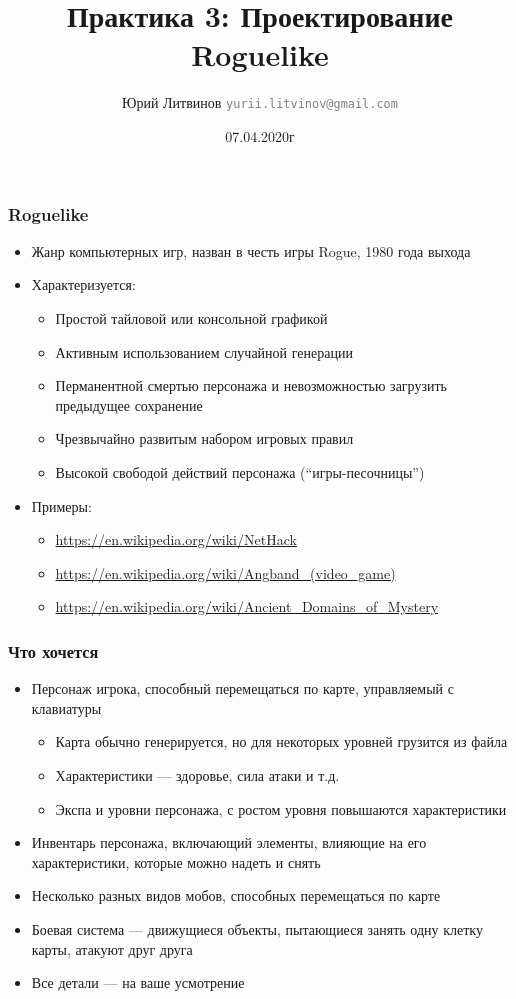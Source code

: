 \documentclass[xetex,mathserif,serif]{beamer}
\title{Практика 3: Проектирование Roguelike}
\author[Юрий Литвинов]{Юрий Литвинов \newline \textcolor{gray}{\small\texttt{yurii.litvinov@gmail.com}}}
\date{07.04.2020г}
\begin{document}
	\maketitle

	\begin{frame}
		\frametitle{Roguelike}
		\begin{itemize}
			\item Жанр компьютерных игр, назван в честь игры Rogue, 1980 года выхода
			\item Характеризуется:
			\begin{itemize}
				\item Простой тайловой или консольной графикой
				\item Активным использованием случайной генерации
				\item Перманентной смертью персонажа и невозможностью загрузить предыдущее сохранение
				\item Чрезвычайно развитым набором игровых правил
				\item Высокой свободой действий персонажа (``игры-песочницы'')
			\end{itemize}
			\item Примеры:
			\begin{itemize}
				\item \url{https://en.wikipedia.org/wiki/NetHack}
				\item \url{https://en.wikipedia.org/wiki/Angband_(video_game)}
				\item \url{https://en.wikipedia.org/wiki/Ancient_Domains_of_Mystery}
			\end{itemize}
		\end{itemize}
	\end{frame}

	\begin{frame}
		\frametitle{Что хочется}
		\begin{itemize}
			\item Персонаж игрока, способный перемещаться по карте, управляемый с клавиатуры
			\begin{itemize}
				\item Карта обычно генерируется, но для некоторых уровней грузится из файла
				\item Характеристики --- здоровье, сила атаки и т.д.
				\item Экспа и уровни персонажа, с ростом уровня повышаются характеристики
			\end{itemize}
			\item Инвентарь персонажа, включающий элементы, влияющие на его характеристики, которые можно надеть и снять
			\item Несколько разных видов мобов, способных перемещаться по карте
			\item Боевая система --- движущиеся объекты, пытающиеся занять одну клетку карты, атакуют друг друга
			\item Все детали --- на ваше усмотрение
		\end{itemize}
	\end{frame}
\end{document}
